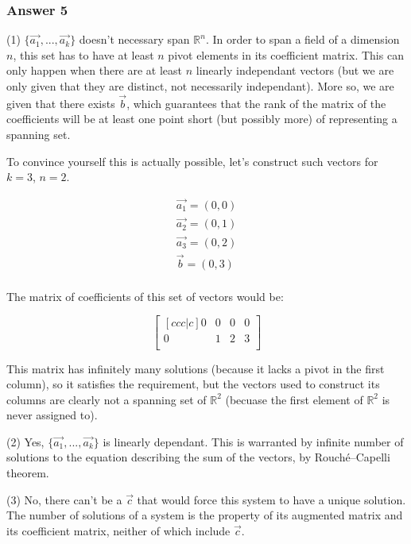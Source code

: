 \documentclass[11pt]{article}
\begin{document}
\subsubsection{Answer 5}
\label{sec-1-5-1}
(1) $\{\vec{a_1}, ..., \vec{a_k}\}$ doesn't necessary span $\mathbb{R}^n$.
In order to span a field of a dimension $n$, this set has to have at least
$n$ pivot elements in its coefficient matrix.  This can only happen when
there are at least $n$ linearly independant vectors (but we are only given
that they are distinct, not necessarily independant).  More so, we are given
that there exists $\vec{b}$, which guarantees that the rank of the matrix of
the coefficients will be at least one point short (but possibly more) of
representing a spanning set.

To convince yourself this is actually possible, let's construct such vectors
for $k=3$, $n=2$.

\begin{equation*}
  \begin{split}
    \vec{a_1} = (0, 0)\\
    \vec{a_2} = (0, 1)\\
    \vec{a_3} = (0, 2)\\
    \vec{b} = (0, 3)\\
  \end{split}
\end{equation*}


The matrix of coefficients of this set of vectors would be:

\begin{equation*}
  \begin{bmatrix}[ccc|c]
    0 & 0 & 0  & 0 \\
    0 & 1 & 2  & 3 \\
  \end{bmatrix}
\end{equation*}


This matrix has infinitely many solutions (because it lacks a pivot in the
first column), so it satisfies the requirement, but the vectors used to
construct its columns are clearly not a spanning set of $\mathbb{R}^2$
(becuase the first element of $\mathbb{R}^2$ is never assigned to).

(2) Yes, $\{\vec{a_1}, ..., \vec{a_k}\}$ is linearly dependant.  This is
warranted by infinite number of solutions to the equation describing the sum
of the vectors, by Rouché–Capelli theorem.

(3) No, there can't be a $\vec{c}$ that would force this system to have a
unique solution.  The number of solutions of a system is the property of its
augmented matrix and its coefficient matrix, neither of which include
$\vec{c}$.
\end{document}
